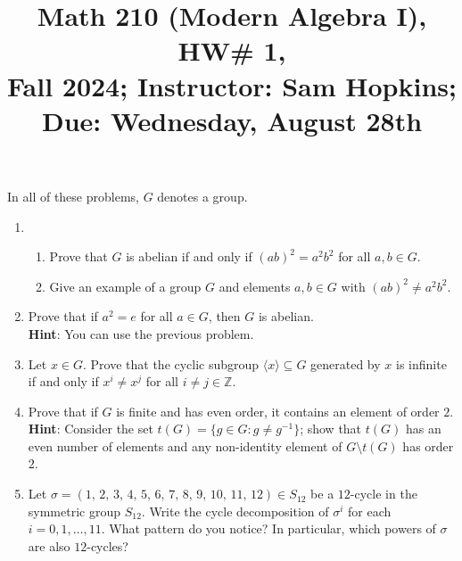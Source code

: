 \documentclass[11pt]{article}
\title{Math 210 (Modern Algebra I), HW\# 1, \\ {\normalsize Fall 2024; Instructor: Sam Hopkins; Due: Wednesday, August 28th}}
\date{}
\begin{document}
\maketitle

\thispagestyle{empty}

In all of these problems, $G$ denotes a group.

\begin{enumerate}

\item \begin{enumerate}
\item Prove that $G$ is abelian if and only if $(ab)^2=a^2b^2$ for all $a,b\in G$. 
\item Give an example of a group $G$ and elements $a,b\in G$ with $(ab)^2\neq a^2b^2$.
\end{enumerate}

\item Prove that if $a^2 = e$ for all $a\in G$, then $G$ is abelian. \\ {\bf Hint}: You can use the previous problem.

\item Let $x\in G$. Prove that the cyclic subgroup $\langle x \rangle \subseteq G$ generated by $x$ is infinite if and only if $x^{i} \neq x^{j}$ for all $i \neq j \in \mathbb{Z}$.

\item Prove that if $G$ is finite and has even order, it contains an element of order $2$. \\ {\bf Hint}: Consider the set $t(G) = \{g \in G\colon g \neq g^{-1}\}$; show that $t(G)$ has an even number of elements and any non-identity element of $G\setminus t(G)$ has order $2$.

\item Let $\sigma = (1, \, 2, \, 3, \, 4, \, 5, \, 6, \, 7, \, 8, \, 9, \, 10, \, 11, \, 12) \in S_{12}$ be a $12$-cycle in the symmetric group $S_{12}$. Write the cycle decomposition of $\sigma^i$ for each $i=0,1,\ldots,11$. What pattern do you notice? In particular, which powers of $\sigma$ are also $12$-cycles?

\end{enumerate}
\end{document}
